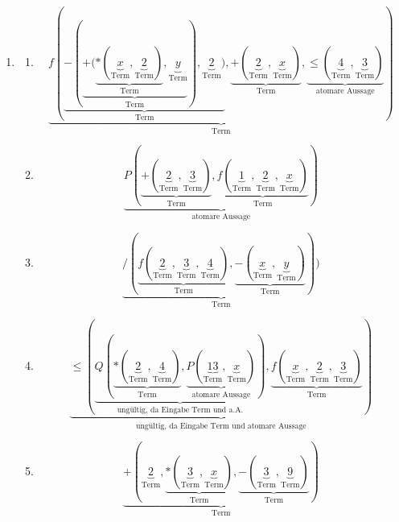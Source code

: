 \documentclass[a4paper]{article}
\begin{document}
\begin{enumerate}
		\item
		\begin{enumerate}
			\item
			\begin{equation*}
				\underbrace{f(\underbrace{-(\underbrace{+(\underbrace{*(\underbrace{x}_{\text{Term}}, \underbrace{2}_{\text{Term}})}_{\text{Term}}, \underbrace{y}_{\text{Term}}}_{\text{Term}}), \underbrace{2}_{\text{Term}})}_{\text{Term}}, \underbrace{+(\underbrace{2}_{\text{Term}}, \underbrace{x}_{\text{Term}})}_{\text{Term}}, \underbrace{\leq(\underbrace{4}_{\text{Term}}, \underbrace{3}_{\text{Term}})}_{\text{atomare Aussage}})}_{\text{Term}}
			\end{equation*}
			
			\item
			\begin{equation*}
				\underbrace{P(\underbrace{+(\underbrace{2}_{\text{Term}}, \underbrace{3}_{\text{Term}})}_{\text{Term}}, \underbrace{f(\underbrace{1}_{\text{Term}}, \underbrace{2}_{\text{Term}}, \underbrace{x}_{\text{Term}})}_{\text{Term}})}_{\text{atomare Aussage}}
			\end{equation*}
			
			\item
			\begin{equation*}
				\underbrace{/(\underbrace{f(\underbrace{2}_{\text{Term}}, \underbrace{3}_{\text{Term}}, \underbrace{4}_{\text{Term}})}_{\text{Term}}, \underbrace{-(\underbrace{x}_{\text{Term}}, \underbrace{y}_{\text{Term}})}_{\text{Term}}))}_{\text{Term}}
			\end{equation*}
			
			\item
			\begin{equation*}
				\underbrace{\leq(\underbrace{Q(\underbrace{*(\underbrace{2}_{\text{Term}}, \underbrace{4}_{\text{Term}})}_{\text{Term}}, \underbrace{P(\underbrace{13}_{\text{Term}}, \underbrace{x}_{\text{Term}})}_{\text{atomare Aussage}})}_{\text{ungültig, da Eingabe Term und a.A.}}, \underbrace{f(\underbrace{x}_{\text{Term}}, \underbrace{2}_{\text{Term}}, \underbrace{3}_{\text{Term}})}_{\text{Term}})}_{\text{ungültig, da Eingabe Term und atomare Aussage}}
			\end{equation*}
			
			\item
			\begin{equation*}
				\underbrace{+(\underbrace{2}_{\text{Term}}, \underbrace{*(\underbrace{3}_{\text{Term}}, \underbrace{x}_{\text{Term}})}_{\text{Term}}, \underbrace{-(\underbrace{3}_{\text{Term}}, \underbrace{9}_{\text{Term}})}_{\text{Term}})}_{\text{Term}}
			\end{equation*}
			

\end{enumerate}
\end{enumerate}
\end{document}
